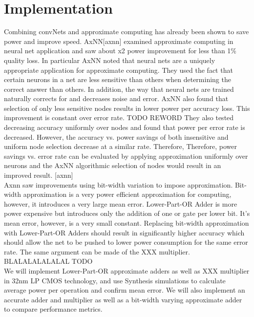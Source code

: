\documentclass[conference]{IEEEtran}
\begin{document}
\section{Implementation}
	\indent Combining convNets and approximate computing has already been shown to save power and improve speed. AxNN[axnn] examined approximate computing in neural net application and saw about x2 power improvement for less than 1\% quality loss. In particular AxNN noted that neural nets are a uniquely appropriate application for approximate computing. They used the fact that certain neurons in a net are less sensitive than others when determining the correct answer than others. In addition, the way that neural nets are trained naturally corrects for and decreases noise and error. AxNN also found that selection of only less sensitive nodes results in lower power per accuracy loss. This improvement is constant over error rate. TODO REWORD
They also tested decreasing accuracy uniformly over nodes and found that power per error rate is decreased. However, the accuracy vs. power savings of both insensitive and uniform node selection decrease at a similar rate. Therefore, 
Therefore, power savings vs. error rate can be evaluated by applying approximation uniformly over neurons and the AxNN algorithmic selection of nodes would result in an improved result. [axnn] \\ 


	\indent Axnn saw improvements using bit-width variation to impose approximation. Bit-width approximation is a very power efficient approximation for computing, however, it introduces a very large mean error. Lower-Part-OR Adder is more power expensive but introduces only the addition of one or gate per lower bit. It's mean error, however, is a very small constant. Replacing bit-width approximation with Lower-Part-OR Adders should result in significantly higher accuracy which should allow the net to be pushed to lower power consumption for the same error rate. The same argument can be made of the XXX multiplier. BLALALALALALAL TODO\\

	\indent We will implement Lower-Part-OR approximate adders as well as XXX multiplier in 32nm LP CMOS technology, and use Synthesis simulations to calculate average power per operation and confirm mean error. We will also implement an accurate adder and multiplier as well as a  bit-width varying approximate adder to compare performance metrics.\\
\end{document}
